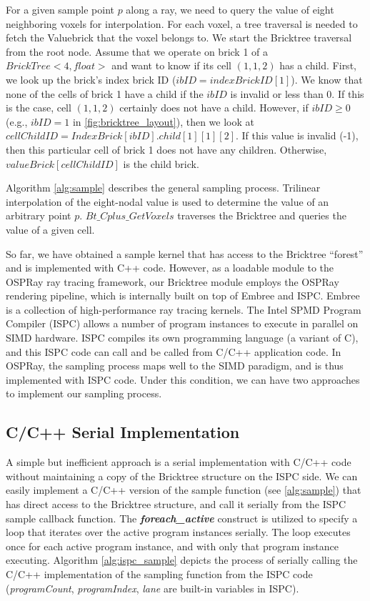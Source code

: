 For a given sample point $p$ along a ray, we need to query the value of eight
neighboring voxels for interpolation. For each voxel, a tree traversal
is needed to fetch the Valuebrick that the voxel belongs to. We start the Bricktree
traversal from the root node. Assume that we operate on brick 1 of a 
$BrickTree<4,float>$ and want to know if its cell $(1,1,2)$ has a child.
First, we look up the brick's index brick ID ($ibID = indexBrickID[1]$).
We know that none of the cells of brick 1 have a child if the $ibID$
is invalid or less than 0. If this is the case, cell $(1,1,2)$ certainly does not have a child.
However, if $ibID \geq 0$ (e.g., $ibID = 1$ in \autoref{fig:bricktree_layout}), 
then we look at $cellChildID = IndexBrick[ibID].child[1][1][2]$. 
If this value is invalid (-1), then this particular cell of brick 1 does not have any
children. Otherwise, $valueBrick[cellChildID]$ is the child brick.

Algorithm \ref{alg:sample} describes the general sampling process. 
Trilinear interpolation of the eight-nodal value is used to determine the value of an 
arbitrary point $p$. $Bt\_Cplus\_GetVoxels$ traverses the Bricktree and queries the 
value of a given cell. 

So far, we have obtained a sample kernel that has access to the Bricktree ``forest'' and is 
implemented with C++ code. However, as a loadable module to the OSPRay ray tracing
framework, our Bricktree module employs the OSPRay rendering pipeline, which is internally
built on top of Embree\cite{wald2014embree} and ISPC\cite{pharr2012ispc}. Embree is
a collection of high-performance ray tracing kernels. 
The Intel SPMD Program Compiler (ISPC) allows a number of program instances
to execute in parallel on SIMD hardware. ISPC compiles its own programming language
(a variant of C), and this ISPC code can call and be called from C/C++ application code.
In OSPRay, the sampling process maps well to the SIMD paradigm, and is thus implemented
with ISPC code. Under this condition, we can have two approaches to implement our
sampling process. 



\subsection{C/C++ Serial Implementation}

A simple but inefficient approach is a serial implementation with C/C++ code without
maintaining a copy of the Bricktree structure on the ISPC side. We can easily 
implement a C/C++ version of the sample function (see \cref{alg:sample}) that has direct
access to the Bricktree structure, and call it serially from the ISPC sample callback
function. The \textbf{\textit{foreach\_active}} construct is
utilized to specify a loop that iterates over the active program instances serially.
The loop executes once for each active program instance, and with only that program
instance executing. Algorithm \ref{alg:ispc_sample} depicts the process of serially calling 
the C/C++ implementation of the sampling function from the ISPC code (\textit{programCount},
\textit{programIndex}, \textit{lane} are built-in variables in ISPC). 

